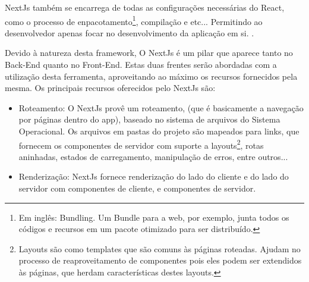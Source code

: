 NextJs também se encarrega de todas as configurações necessárias do React, como o processo
de
enpacotamento\footnote{Em inglês: Bundling. Um Bundle para a \acrshort{web},
    por exemplo, junta todos os códigos e recursos em um pacote otimizado
    para ser distribuído.
},
compilação e etc...
Permitindo ao desenvolvedor apenas focar no desenvolvimento da aplicação em si.
\cite{nexjs-docs}.

Devido à natureza desta framework, O NextJs é um pilar que aparece
tanto no Back-End quanto no Front-End. Estas duas frentes serão abordadas
com a utilização desta ferramenta, aproveitando ao máximo os recursos fornecidos
pela mesma. Os principais recursos oferecidos pelo NextJs são:

\begin{itemize}
        
	\item Roteamento: O NextJs provê um roteamento, (que é basicamente a navegação por páginas
                    dentro do app), baseado no sistema de arquivos do Sistema Operacional. Os arquivos
                    em pastas do projeto são mapeados para links, que fornecem os componentes de servidor
                    com suporte a
                    layouts\footnote{Layouts são como templates que são comuns às páginas roteadas. Ajudam no processo
                        de reaproveitamento de componentes pois eles podem ser extendidos às páginas,
                        que herdam características destes layouts.
                    },
                    rotas aninhadas, estados de carregamento, manipulação de erros,
                    entre outros...
                
	\item Renderização: NextJs fornece renderização do lado do cliente e do lado do servidor com
                    componentes de cliente, e componentes de servidor.
                

\end{itemize}
